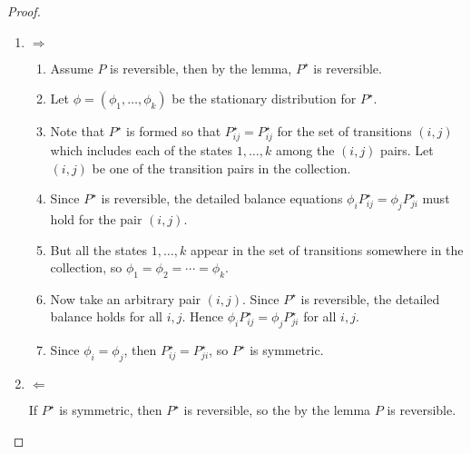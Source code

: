 \documentclass[12pt]{article}
\begin{document}
\begin{proof}
    \begin{enumerate}
        \item
            \( \Rightarrow \)
            \begin{enumerate}
                \item
                    Assume \( P \) is reversible, then by the lemma, \(
                    P^{\star} \) is reversible.
                \item
                    Let \( \phi = (\phi_1, \dots, \phi_k) \) be the
                    stationary distribution for \( P^{\star} \).
                \item
                    Note that \( P^{\star} \) is formed so that \( P_{ij}^
                    {\star} = P_{ij}^{\star} \) for the set of
                    transitions \( (i,j) \) which includes each of the
                    states \( 1, \dots, k \) among the \( (i,j) \)
                    pairs.  Let \( (i,j) \) be one of the transition
                    pairs in the collection.
                \item
                    Since \( P^{\star} \) is reversible, the detailed
                    balance equations \( \phi_i P_{ij}^{\star} = \phi_j
                    P_{ji}^{\star} \) must hold for the pair \( (i,j) \).
                \item
                    But all the states \( 1, \dots, k \) appear in the
                    set of transitions somewhere in the collection, so \(
                    \phi_1 = \phi_2 = \cdots = \phi_k \).
                \item
                    Now take an arbitrary pair \( (i,j) \).  Since \( P^
                    {\star} \) is reversible, the detailed balance holds
                    for all \( i,j \).  Hence \( \phi_i P_{ij}^{\star} =
                    \phi_j P_{ji}^{\star} \) for all \( i,j \).
                \item
                    Since \( \phi_i = \phi_j \), then \( P_{ij}^{\star}
                    = P_{ji}^{\star} \), so \( P^{\star} \) is
                    symmetric.
            \end{enumerate}
        \item
            \( \Leftarrow \)

            If \( P^{\star} \) is symmetric, then \( P^{\star} \) is
            reversible, so the by the lemma \( P \) is reversible.
    \end{enumerate}
\end{proof}
\end{document}
